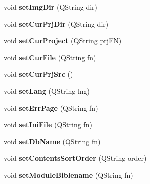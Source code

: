 \begin{DoxyCompactItemize}
\item 
\hypertarget{classConfig_a0f4bf5165d5abc3762b770772da568ce}{
void {\bfseries setImgDir} (QString dir)}
\label{classConfig_a0f4bf5165d5abc3762b770772da568ce}

\item 
\hypertarget{classConfig_a313d02dd58f9f9fe973a287bb831b9ef}{
void {\bfseries setCurPrjDir} (QString dir)}
\label{classConfig_a313d02dd58f9f9fe973a287bb831b9ef}

\item 
\hypertarget{classConfig_af68f5fa366fb23a0139db52c0803e303}{
void {\bfseries setCurProject} (QString prjFN)}
\label{classConfig_af68f5fa366fb23a0139db52c0803e303}

\item 
\hypertarget{classConfig_aa0a59c988b8603c947886e8f74bdf3fb}{
void {\bfseries setCurFile} (QString fn)}
\label{classConfig_aa0a59c988b8603c947886e8f74bdf3fb}

\item 
\hypertarget{classConfig_ab4f09a3e974634518128e363e86e253c}{
void {\bfseries setCurPrjSrc} ()}
\label{classConfig_ab4f09a3e974634518128e363e86e253c}

\item 
\hypertarget{classConfig_a106b46916fca3c6cb2494349262ebeb2}{
void {\bfseries setLang} (QString lng)}
\label{classConfig_a106b46916fca3c6cb2494349262ebeb2}

\item 
\hypertarget{classConfig_af7601b1f60d77b78d2ede52d671eeb6a}{
void {\bfseries setErrPage} (QString fn)}
\label{classConfig_af7601b1f60d77b78d2ede52d671eeb6a}

\item 
\hypertarget{classConfig_abec65e9205ce71821edbebd62edf98ad}{
void {\bfseries setIniFile} (QString fn)}
\label{classConfig_abec65e9205ce71821edbebd62edf98ad}

\item 
\hypertarget{classConfig_a716200e88a22ef7138f6670f93b314a3}{
void {\bfseries setDbName} (QString fn)}
\label{classConfig_a716200e88a22ef7138f6670f93b314a3}

\item 
\hypertarget{classConfig_a47451584970944df67213e8ef747086d}{
void {\bfseries setContentsSortOrder} (QString order)}
\label{classConfig_a47451584970944df67213e8ef747086d}

\item 
\hypertarget{classConfig_ae04e190b01ce7694439dd06f69e28830}{
void {\bfseries setModuleBiblename} (QString fn)}
\label{classConfig_ae04e190b01ce7694439dd06f69e28830}


\end{DoxyCompactItemize}

